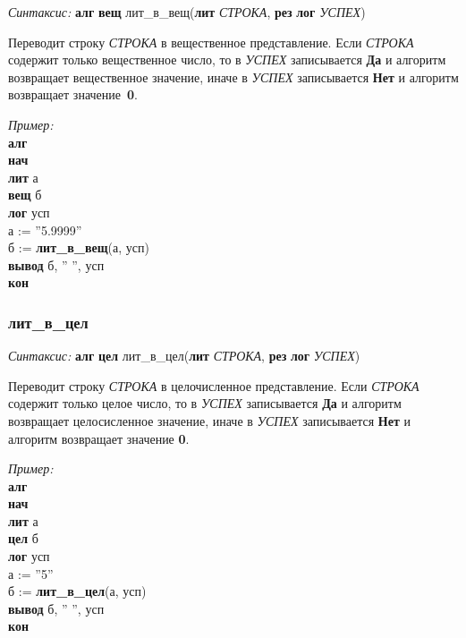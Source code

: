 \emph{Синтаксис:} \textbf{алг} \textbf{вещ} лит\_в\_вещ(\textbf{лит} \emph{СТРОКА}, \textbf{рез} \textbf{лог} \emph{УСПЕХ})


      
        Переводит строку \emph{СТРОКА} в вещественное представление. 
Если \emph{СТРОКА} содержит только вещественное число, то в \emph{УСПЕХ} 
записывается \textbf{Да} и алгоритм возвращает вещественное значение, иначе в \emph{УСПЕХ} 
записывается \textbf{Нет} и алгоритм возвращает значение~\textbf{0}.
      
  
\emph{Пример:}
\sffamily
~\\\textbf{алг 
~\\ \textbf{нач}
~\\\otstup лит} а
~\\\otstup \textbf{вещ} б
~\\\otstup \textbf{лог} усп
~\\\otstup а := ''5.9999''
~\\\otstup б := \textbf{лит\_в\_вещ}(а, усп)
~\\\otstup \textbf{вывод} б, '' '', усп
~\\\textbf{кон}



\normalfont
\subsubsection{лит\_в\_цел}

\emph{Синтаксис:} \textbf{алг} \textbf{цел} лит\_в\_цел(\textbf{лит} \emph{СТРОКА}, \textbf{рез} \textbf{лог} \emph{УСПЕХ})


      

        Переводит строку \emph{СТРОКА} в целочисленное представление. 
Если \emph{СТРОКА} содержит только целое число, то в \emph{УСПЕХ} записывается \textbf{Да} 
и алгоритм возвращает целосисленное значение, иначе в \emph{УСПЕХ} записывается \textbf{Нет} 
и алгоритм возвращает значение \textbf{0}.
      
\emph{Пример:}  
\sffamily
~\\\textbf{алг 
~\\нач
~\\\otstup лит} а
~\\\otstup \textbf{цел} б
~\\\otstup \textbf{лог} усп
~\\\otstup а := ''5''
~\\\otstup б := \textbf{лит\_в\_цел}(а, усп)
~\\\otstup \textbf{вывод} б, '' '', усп
~\\\textbf{кон}

